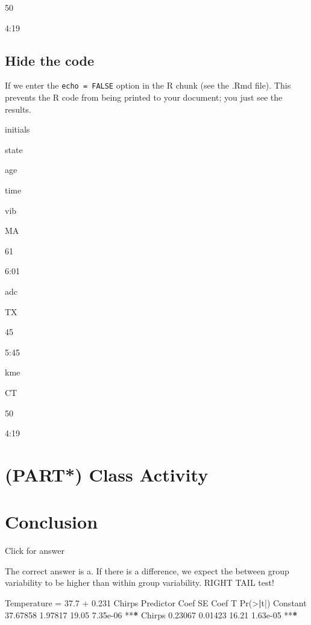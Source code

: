 \documentclass[
]{book}
\newenvironment{Shaded}{\begin{snugshade}}{\end{snugshade}}
\newcommand{\ErrorTok}[1]{\textcolor[rgb]{0.64,0.00,0.00}{\textbf{#1}}}
\newcommand{\FloatTok}[1]{\textcolor[rgb]{0.00,0.00,0.81}{#1}}
\newcommand{\FunctionTok}[1]{\textcolor[rgb]{0.00,0.00,0.00}{#1}}
\newcommand{\NormalTok}[1]{#1}
\newcommand{\OtherTok}[1]{\textcolor[rgb]{0.56,0.35,0.01}{#1}}
\newcommand{\SpecialCharTok}[1]{\textcolor[rgb]{0.00,0.00,0.00}{#1}}
\begin{document}
50

4:19

\hypertarget{hide-the-code}{%
\section{Hide the code}\label{hide-the-code}}

If we enter the \texttt{echo\ =\ FALSE} option in the R chunk (see the .Rmd file). This prevents the R code from being printed to your document; you just see the results.

initials

state

age

time

vib

MA

61

6:01

adc

TX

45

5:45

kme

CT

50

4:19

\hypertarget{part-class-activity}{%
\chapter{(PART*) Class Activity}\label{part-class-activity}}

\hypertarget{conclusion}{%
\chapter{Conclusion}\label{conclusion}}

Click for answer

The correct answer is a. If there is a difference, we expect the between group variability to be higher than within group variability. RIGHT TAIL test!

\begin{Shaded}
\begin{Highlighting}[]
\NormalTok{Temperature  }\OtherTok{=}  \FloatTok{37.7} \SpecialCharTok{+} \FloatTok{0.231}\NormalTok{ Chirps}
\NormalTok{Predictor       Coef    SE Coef      T    }\FunctionTok{Pr}\NormalTok{(}\SpecialCharTok{\textgreater{}}\ErrorTok{|}\NormalTok{t}\SpecialCharTok{|}\NormalTok{)    }
\NormalTok{Constant    }\FloatTok{37.67858}    \FloatTok{1.97817}   \FloatTok{19.05}  \FloatTok{7.35e{-}06} \SpecialCharTok{**}\ErrorTok{*}
\NormalTok{Chirps       }\FloatTok{0.23067}    \FloatTok{0.01423}   \FloatTok{16.21}  \FloatTok{1.63e{-}05} \SpecialCharTok{**}\ErrorTok{*}
\end{Highlighting}
\end{Shaded}
\end{document}
